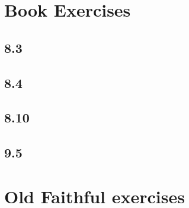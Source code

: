 \documentclass[a4paper]{article}
\begin{document}
\maketitle

\newpage
\tableofcontents
\newpage

\section{Book Exercises}
\subsection{8.3}

\subsection{8.4}

\subsection{8.10}

\subsection{9.5}


\section{Old Faithful exercises}
\subsection{}

\subsection{}

\subsection{}

\subsection{}

\end{document}
